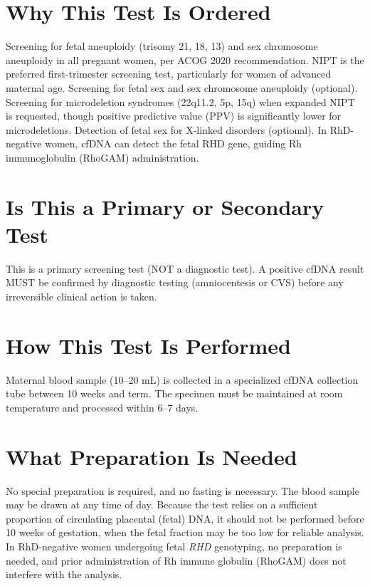 \section*{Why This Test Is Ordered}
Screening for fetal aneuploidy (trisomy 21, 18, 13) and sex chromosome aneuploidy in all pregnant women, per ACOG 2020 recommendation. NIPT is the preferred first-trimester screening test, particularly for women of advanced maternal age. Screening for fetal sex and sex chromosome aneuploidy (optional). Screening for microdeletion syndromes (22q11.2, 5p, 15q) when expanded NIPT is requested, though positive predictive value (PPV) is significantly lower for microdeletions. Detection of fetal sex for X-linked disorders (optional). In RhD-negative women, cfDNA can detect the fetal RHD gene, guiding Rh immunoglobulin (RhoGAM) administration.

\section*{Is This a Primary or Secondary Test}
This is a primary screening test (NOT a diagnostic test). A positive cfDNA result MUST be confirmed by diagnostic testing (amniocentesis or CVS) before any irreversible clinical action is taken.

\section*{How This Test Is Performed}
Maternal blood sample (10--20 mL) is collected in a specialized cfDNA collection tube between 10 weeks and term. The specimen must be maintained at room temperature and processed within 6--7 days.

\section*{What Preparation Is Needed}
No special preparation is required, and no fasting is necessary. The blood sample may be drawn at any time of day. Because the test relies on a sufficient proportion of circulating placental (fetal) DNA, it should not be performed before 10 weeks of gestation, when the fetal fraction may be too low for reliable analysis. In RhD-negative women undergoing fetal \textit{RHD} genotyping, no preparation is needed, and prior administration of Rh immune globulin (RhoGAM) does not interfere with the analysis.

